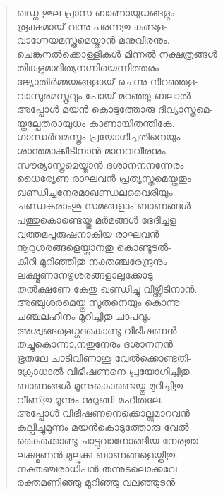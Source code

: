 \begin{verse}
ഖഡ്ഗ ശൂല പ്രാസ ബാണായുധങ്ങളും\\
രൂക്ഷമായ് വന്നു പരന്നതു കണ്ടള-\\
വാഗ്നേയമസ്ത്രമെയ്താന്‍ മനുവീരനും.\\
ചെങ്കനല്‍ക്കൊള്ളികള്‍ മിന്നല്‍ നക്ഷത്രങ്ങള്‍\\
തിങ്കളുമാദിത്യനഗ്നിയെന്നിത്തരം\\
ജ്യോതിര്‍മ്മയങ്ങളായ് ചെന്നു നിറഞ്ഞള-\\
വാസുരമസ്ത്രവും പോയ് മറഞ്ഞൂ ബലാല്‍\\
അപ്പോള്‍ മയന്‍ കൊടുത്തോരു ദിവ്യാസ്ത്രമെ-\\
യ്തല്പേതരായുധം കാണായിതന്തികേ.\\
ഗാന്ധര്‍വമസ്ത്രം പ്രയോഗിച്ചതിനെയും\\
ശാന്തമാക്കീടിനാന്‍ മാനവവീരനും.\\
സൗര്യാസ്ത്രമെയ്താന്‍ ദശാനനനന്നേരം\\
ധൈര്യേണ രാഘവന്‍ പ്രത്യസ്ത്രമെയ്തതും\\
ഖണ്ഡിച്ചനേരമാഖണ്ഡലവൈരിയും\\
ചണ്ഡകരാംശു സമങ്ങളാം ബാണങ്ങള്‍\\
പത്തുകൊണ്ടെയ്തു മര്‍മങ്ങള്‍ ഭേദിച്ചള-\\
വുത്തമപൂരുഷനാകിയ രാഘവന്‍\\
നൂറുശരങ്ങളെയ്താനതു കൊണ്ടുടല്‍-\\
കീറി മുറിഞ്ഞിതു നക്തഞ്ചരേന്ദ്രനും\\
ലക്ഷ്മണനേഴുശരങ്ങളാലൂക്കോടു\\
തല്‍ക്ഷണേ കേതു ഖണ്ഡിച്ചു വീഴ്ത്തീടിനാന്‍.\\
അഞ്ചുശരമെയ്തു സൂതനെയും കൊന്നു\\
ചഞ്ചലഹീനം മുറിച്ചിതു ചാപവും\\
അശ്വങ്ങളെഗ്ഗദകൊണ്ടു വിഭീഷണന്‍\\
തച്ചുകൊന്നാ,നതുനേരം ദശാനനന്‍\\
ഭൂതലേ ചാടിവീണാശു വേല്‍ക്കൊണ്ടതി-\\
ക്രോധാല്‍ വിഭീഷണനെ പ്രയോഗിച്ചിതു.\\
ബാണങ്ങള്‍ മൂന്നുകൊണ്ടെയ്തു മുറിച്ചിതു\\
വീണിതു മൂന്നും നുറുങ്ങി മഹീതലേ.\\
അപ്പോള്‍ വിഭീഷണനെക്കൊല്ലുമാറവന്‍\\
കല്പിച്ചുമുന്നം മയന്‍കൊടുത്തോരു വേല്‍\\
കൈക്കൊണ്ടു ചാട്ടുവാനോങ്ങിയ നേരത്തു\\
ലക്ഷ്മണന്‍ മുല്പുക്കു ബാണങ്ങളെയ്തിതു.\\
നക്തഞ്ചരാധിപന്‍ തന്നുടലൊക്കവേ\\
രക്തമണിഞ്ഞു മുറിഞ്ഞു വലഞ്ഞുടന്‍\\

\end{verse}
